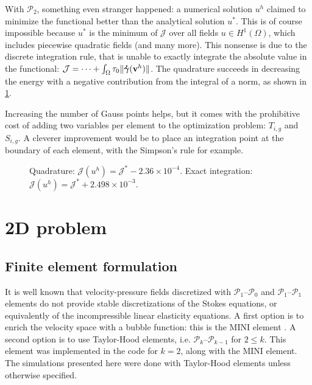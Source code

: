 \documentclass[11 pt]{report}
\begin{document}
\pagebreak
With $\mathcal{P}_2$, something even stranger happened: a numerical solution $u^h$ claimed to minimize the functional better than the analytical solution $u^*$. This is of course impossible because $u^*$ is the minimum of $\mathcal{J}$ over all fields $u \in H^1(\Omega)$, which includes piecewise quadratic fields (and many more). This nonsense is due to the discrete integration rule, that is unable to exactly integrate the absolute value in the functional: $\mathcal{J} = \dots + \int_{\Omega}\tau_0 \|\boldsymbol{\dot \gamma}(\mathbf{v}^h)\|$. The quadrature succeeds in decreasing the energy with a negative contribution from the integral of a norm, as shown in \cref{fig:sensibility_quad}.

Increasing the number of Gauss points helps, but it comes with the prohibitive cost of adding two variables per element to the optimization problem: $T_{i,g}$ and $S_{i,g}$. A cleverer improvement would be to place an integration point at the boundary of each element, with the Simpson's rule for example.

\begin{figure}[!b]
    \centering
    
    \caption{Quadrature: $\mathcal{J}(u^h) = \mathcal{J}^* - 2.36\times 10^{-4}$. Exact integration: $\mathcal{J}(u^h) = \mathcal{J}^* + 2.498\times 10^{-3}$.}
    \label{fig:sensibility_quad}
\end{figure}




\chapter{2D problem}
\label{chap:chap2D}

\section{Finite element formulation}
It is well known that velocity-pressure fields discretized with $\mathcal{P}_1$--$\mathcal{P}_0$ and $\mathcal{P}_1$--$\mathcal{P}_1$ elements do not provide stable discretizations of the Stokes equations, or equivalently of the incompressible linear elasticity equations. A first option is to enrich the velocity space with a bubble function: this is the MINI element \cite{ministable}. A second option is to use Taylor-Hood elements, i.e. $\mathcal{P}_k$--$\mathcal{P}_{k-1}$ for $2 \leq k$. This element was implemented in the code for $k=2$, along with the MINI element. The simulations presented here were done with Taylor-Hood elements unless otherwise specified.
\end{document}

